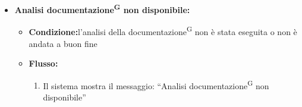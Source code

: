 \documentclass[a4paper, 11pt]{article}
\begin{document}
\begin{itemize}
\begin{itemize}
\begin{itemize}
				\item \textbf{Condizione:}La repository non contiene documentazione\textsuperscript{G} analizzabile
				\item \textbf{Flusso:}
				\begin{enumerate}
					\item Il sistema mostra il messaggio: “Documentazione\textsuperscript{G} assente”
				\end{enumerate}
			\end{itemize}
		\item \textbf{Analisi documentazione\textsuperscript{G} non disponibile:}
			\begin{itemize}
				\item \textbf{Condizione:}l'analisi della documentazione\textsuperscript{G} non è stata eseguita o non è andata a buon fine
				\item \textbf{Flusso:}
				\begin{enumerate}
					\item Il sistema mostra il messaggio: “Analisi documentazione\textsuperscript{G} non disponibile”
				\end{enumerate}
			\end{itemize}
	\end{itemize}
\end{itemize}
\end{document}
